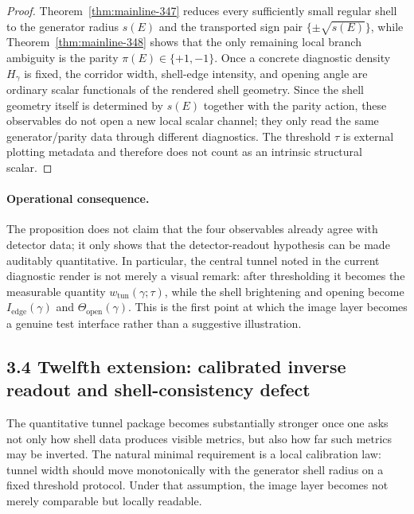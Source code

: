 \begin{proof}
Theorem~\ref{thm:mainline-347} reduces every sufficiently small regular shell to the generator radius $s(E)$ and the transported sign pair $\{\pm\sqrt{s(E)}\}$, while Theorem~\ref{thm:mainline-348} shows that the only remaining local branch ambiguity is the parity $\pi(E)\in\{+1,-1\}$. Once a concrete diagnostic density $H_\gamma$ is fixed, the corridor width, shell-edge intensity, and opening angle are ordinary scalar functionals of the rendered shell geometry. Since the shell geometry itself is determined by $s(E)$ together with the parity action, these observables do not open a new local scalar channel; they only read the same generator/parity data through different diagnostics. The threshold $\tau$ is external plotting metadata and therefore does not count as an intrinsic structural scalar.
\end{proof}

\paragraph{Operational consequence.}
The proposition does not claim that the four observables already agree with detector data; it only shows that the detector-readout hypothesis can be made auditably quantitative. In particular, the central tunnel noted in the current diagnostic render is not merely a visual remark: after thresholding it becomes the measurable quantity $w_{\mathrm{tun}}(\gamma;\tau)$, while the shell brightening and opening become $I_{\mathrm{edge}}(\gamma)$ and $\Theta_{\mathrm{open}}(\gamma)$. This is the first point at which the image layer becomes a genuine test interface rather than a suggestive illustration.


\subsection*{3.4 Twelfth extension: calibrated inverse readout and shell-consistency defect}
The quantitative tunnel package becomes substantially stronger once one asks not only how shell data produces visible metrics, but also how far such metrics may be inverted. The natural minimal requirement is a local calibration law: tunnel width should move monotonically with the generator shell radius on a fixed threshold protocol. Under that assumption, the image layer becomes not merely comparable but locally readable.

